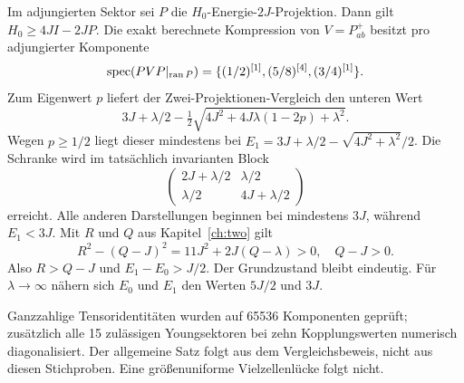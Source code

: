 Im adjungierten Sektor sei $P$ die $H_0$-Energie-$2J$-Projektion. Dann gilt $H_0\ge4JI-2JP$. Die exakt berechnete Kompression von $V=P^+_{ab}$ besitzt pro adjungierter Komponente
\begin{equation}
\operatorname{spec}(PVP|_{\operatorname{ran}P})
=\{(1/2)^{[1]},(5/8)^{[4]},(3/4)^{[1]}\}.
\end{equation}
Zum Eigenwert $p$ liefert der Zwei-Projektionen-Vergleich den unteren Wert
\begin{equation}
3J+\lambda/2-\tfrac12\sqrt{4J^2+4J\lambda(1-2p)+\lambda^2}.
\end{equation}
Wegen $p\ge1/2$ liegt dieser mindestens bei $E_1=3J+\lambda/2-\sqrt{4J^2+\lambda^2}/2$. Die Schranke wird im tatsächlich invarianten Block
\begin{equation}
\begin{pmatrix}2J+\lambda/2&\lambda/2\\\lambda/2&4J+\lambda/2\end{pmatrix}
\end{equation}
erreicht. Alle anderen Darstellungen beginnen bei mindestens $3J$, während $E_1<3J$. Mit $R$ und $Q$ aus Kapitel~\ref{ch:two} gilt
\begin{equation}
R^2-(Q-J)^2=11J^2+2J(Q-\lambda)>0,\quad Q-J>0.
\end{equation}
Also $R>Q-J$ und $E_1-E_0>J/2$. Der Grundzustand bleibt eindeutig. Für $\lambda\to\infty$ nähern sich $E_0$ und $E_1$ den Werten $5J/2$ und $3J$.

Ganzzahlige Tensoridentitäten wurden auf 65536 Komponenten geprüft; zusätzlich alle 15 zulässigen Youngsektoren bei zehn Kopplungswerten numerisch diagonalisiert. Der allgemeine Satz folgt aus dem Vergleichsbeweis, nicht aus diesen Stichproben. Eine größenuniforme Vielzellenlücke folgt nicht.


